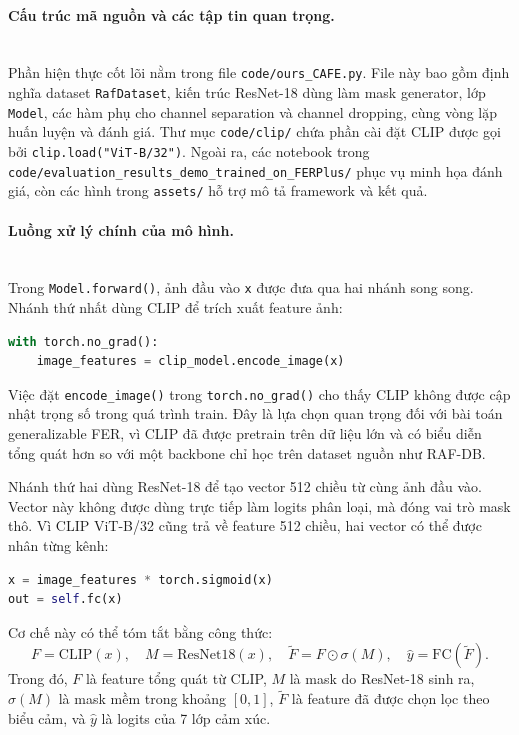 \paragraph{Cấu trúc mã nguồn và các tập tin quan trọng.}\mbox{}\\
Phần hiện thực cốt lõi nằm trong file \texttt{code/ours\_CAFE.py}. File này bao gồm định nghĩa dataset \texttt{RafDataset}, kiến trúc ResNet-18 dùng làm mask generator, lớp \texttt{Model}, các hàm phụ cho channel separation và channel dropping, cùng vòng lặp huấn luyện và đánh giá. Thư mục \texttt{code/clip/} chứa phần cài đặt CLIP được gọi bởi \texttt{clip.load("ViT-B/32")}. Ngoài ra, các notebook trong \texttt{code/evaluation\_results\_demo\_trained\_on\_FERPlus/} phục vụ minh họa đánh giá, còn các hình trong \texttt{assets/} hỗ trợ mô tả framework và kết quả.

\paragraph{Luồng xử lý chính của mô hình.}\mbox{}\\
Trong \texttt{Model.forward()}, ảnh đầu vào \texttt{x} được đưa qua hai nhánh song song. Nhánh thứ nhất dùng CLIP để trích xuất feature ảnh:
\begin{lstlisting}[language=Python]
with torch.no_grad():
    image_features = clip_model.encode_image(x)
\end{lstlisting}
Việc đặt \texttt{encode\_image()} trong \texttt{torch.no\_grad()} cho thấy CLIP không được cập nhật trọng số trong quá trình train. Đây là lựa chọn quan trọng đối với bài toán generalizable FER, vì CLIP đã được pretrain trên dữ liệu lớn và có biểu diễn tổng quát hơn so với một backbone chỉ học trên dataset nguồn như RAF-DB.

Nhánh thứ hai dùng ResNet-18 để tạo vector 512 chiều từ cùng ảnh đầu vào. Vector này không được dùng trực tiếp làm logits phân loại, mà đóng vai trò mask thô. Vì CLIP ViT-B/32 cũng trả về feature 512 chiều, hai vector có thể được nhân từng kênh:
\begin{lstlisting}[language=Python]
x = image_features * torch.sigmoid(x)
out = self.fc(x)
\end{lstlisting}
Cơ chế này có thể tóm tắt bằng công thức:
\[
F = \mathrm{CLIP}(x), \quad
M = \mathrm{ResNet18}(x), \quad
\widetilde{F} = F \odot \sigma(M), \quad
\hat{y} = \mathrm{FC}(\widetilde{F}).
\]
Trong đó, \(F\) là feature tổng quát từ CLIP, \(M\) là mask do ResNet-18 sinh ra, \(\sigma(M)\) là mask mềm trong khoảng \([0,1]\), \(\widetilde{F}\) là feature đã được chọn lọc theo biểu cảm, và \(\hat{y}\) là logits của 7 lớp cảm xúc.

